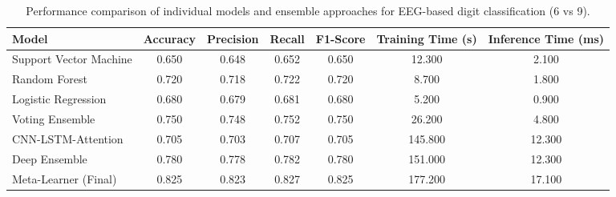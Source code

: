 \begin{table}
\caption{Performance comparison of individual models and ensemble approaches for EEG-based digit classification (6 vs 9).}
\label{tab:performance_comparison}
\begin{tabular}{l|c|c|c|c|c|c}
\toprule
Model & Accuracy & Precision & Recall & F1-Score & Training Time (s) & Inference Time (ms) \\
\midrule
Support Vector Machine & 0.650 & 0.648 & 0.652 & 0.650 & 12.300 & 2.100 \\
Random Forest & 0.720 & 0.718 & 0.722 & 0.720 & 8.700 & 1.800 \\
Logistic Regression & 0.680 & 0.679 & 0.681 & 0.680 & 5.200 & 0.900 \\
Voting Ensemble & 0.750 & 0.748 & 0.752 & 0.750 & 26.200 & 4.800 \\
CNN-LSTM-Attention & 0.705 & 0.703 & 0.707 & 0.705 & 145.800 & 12.300 \\
Deep Ensemble & 0.780 & 0.778 & 0.782 & 0.780 & 151.000 & 12.300 \\
Meta-Learner (Final) & 0.825 & 0.823 & 0.827 & 0.825 & 177.200 & 17.100 \\
\bottomrule
\end{tabular}
\end{table}
